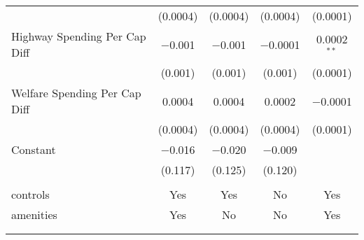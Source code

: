\begin{table}[!htbp]
\begin{tabular}{@{\extracolsep{5pt}}lcccc}
  & (0.0004) & (0.0004) & (0.0004) & (0.0001) \\ 
  Highway Spending Per Cap Diff & $-$0.001 & $-$0.001 & $-$0.0001 & 0.0002$^{**}$ \\ 
  & (0.001) & (0.001) & (0.001) & (0.0001) \\ 
  Welfare Spending Per Cap Diff & 0.0004 & 0.0004 & 0.0002 & $-$0.0001 \\ 
  & (0.0004) & (0.0004) & (0.0004) & (0.0001) \\ 
  Constant & $-$0.016 & $-$0.020 & $-$0.009 &  \\ 
  & (0.117) & (0.125) & (0.120) &  \\ 
 \hline \\[-1.8ex] 
controls & Yes & Yes & No & Yes \\ 
amenities & Yes & No & No & Yes \\ 
\hline \\[-1.8ex] 
\hline 
\hline \\[-1.8ex] 
\end{tabular} 
\end{table} 
